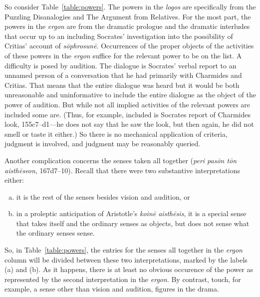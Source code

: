 So consider Table~\ref{table:powers}. The powers in the \emph{logos} are specifically from the Puzzling Disanalogies and The Argument from Relatives. For the most part, the powers in the \emph{ergon} are from the dramatic prologue and the dramatic interludes that occur up to an including Socrates' investigation into the possibility of Critias' account of \emph{sōphrosunē}. Occurrences of the proper objects of the activities of these powers in the \emph{ergon} suffice for the relevant power to be on the list. A difficulty is posed by audition. The dialogue is Socrates' verbal report to an unnamed person of a conversation that he had primarily with Charmides and Critias. That means that the entire dialogue was heard but it would be both unreasonable and uninformative to include the entire dialogue as the object of the power of audition. But while not all implied activities of the relevant powers are included some are. (Thus, for example, included is Socrates report of Charmides look, 155c7–d1—he does not say that he saw the look, but then again, he did not smell or taste it either.) So there is no mechanical application of criteria, judgment is involved, and judgment may be reasonably queried. 

Another complication concerns the senses taken all together (\emph{peri pasōn tōn aisthēseon}, 167d7–10). Recall that there were two substantive interpretations either:
\begin{enumerate}[(a)]
	\item it is the rest of the senses besides vision and audition, or
	\item in a proleptic anticipation of Aristotle's \emph{koinē aisthēsis}, it is a special sense that takes itself and the ordinary senses as objects, but does not sense what the ordinary senses sense.
\end{enumerate}
So, in Table~\ref{table:powers}, the entries for the senses all together in the \emph{ergon} column will be divided between these two interpretations, marked by the labels (a) and (b). As it happens, there is at least no obvious occurence of the power as represented by the second interpretation in the \emph{ergon}. By contrast, touch, for example, a sense other than vision and audition, figures in the drama.

